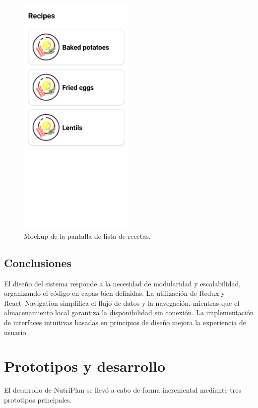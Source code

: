 \documentclass[twoside, openright, 11pt]{report}
\begin{document}
\begin{figure}[h]
  \centering
  \includegraphics[width=0.5\textwidth]{imagenes/RecipesScreen.jpeg}
  \caption{Mockup de la pantalla de lista de recetas.}
  \label{fig:mockup_lista}
\end{figure}

\section{Conclusiones}
El diseño del sistema responde a la necesidad de modularidad y escalabilidad, organizando el código en capas bien definidas. La utilización de Redux y React Navigation simplifica el flujo de datos y la navegación, mientras que el almacenamiento local garantiza la disponibilidad sin conexión. La implementación de interfaces intuitivas basadas en principios de diseño mejora la experiencia de usuario.

\chapter{Prototipos y desarrollo}\label{cap.prototipos y desarrollo}

El desarrollo de NutriPlan se llevó a cabo de forma incremental mediante tres prototipos principales.
\end{document}
